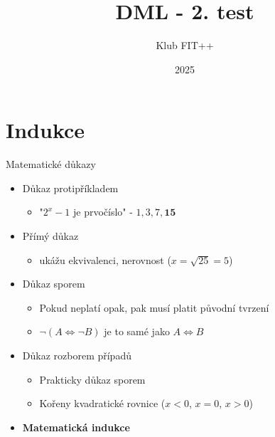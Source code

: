 \documentclass[aspectratio=1610]{beamer}
\title{DML - 2. test}
\author{Klub FIT++}
\date{2025}
\begin{document}
\maketitle

\section{Indukce}

\begin{frame}{Matematické důkazy}

\begin{itemize}
  \item Důkaz protipříkladem \begin{itemize}
      \item "$2^x - 1$ je prvočíslo" - $1, 3, 7, \textbf{15}$ \lightning
    \end{itemize}
  \item Přímý důkaz \begin{itemize}
      \item ukážu ekvivalenci, nerovnost ($x = \sqrt{25} = 5$)
    \end{itemize}
  \item Důkaz sporem \begin{itemize}
      \item Pokud neplatí opak, pak musí platit původní tvrzení
      \item $\neg (A \Leftrightarrow \neg B)$ je to samé jako $A \Leftrightarrow B$
    \end{itemize}
  \item Důkaz rozborem případů \begin{itemize}
    \item Prakticky důkaz sporem
    \item Kořeny kvadratické rovnice ($x < 0$, $x = 0$, $x > 0$)
  \end{itemize}
  \item \textbf{Matematická indukce}
\end{itemize}

\end{frame}
\end{document}
